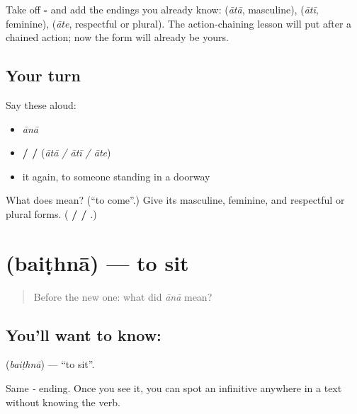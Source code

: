 \begin{grammarlens}[title={What you've built}]
Take off \textbf{-} and add the endings you already know: \textbf{} (\emph{ātā}, masculine), \textbf{} (\emph{ātī}, feminine), \textbf{} (\emph{āte}, respectful or plural). The action-chaining lesson will put \textbf{ } after a chained action; now the form will already be yours.
\end{grammarlens}

\subsection*{Your turn}
Say these aloud:

\begin{itemize}
\raggedright
  \item \emph{ānā}
  \item \textbf{ /  / } (\emph{ātā / ātī / āte})
  \item it again, to someone standing in a doorway
\end{itemize}

\begin{tcolorbox}[breakable,colback=teal!4,colframe=teal!35!black,title={Before you move on}]
What does \textbf{} mean? (\textquotedblleft{}to come\textquotedblright{}.) Give its masculine, feminine, and respectful or plural forms. (\textbf{ /  / }.)
\end{tcolorbox}
\section[\texorpdfstring{\hi{बैठना} (baiṭhnā)}{बैठना (baiṭhnā)}]{ (baiṭhnā) — to sit}

\label{lesson:HI-C42-sit}



\begin{quote}
Before the new one: what did \emph{ānā} mean?
\end{quote}

\subsection*{You'll want to know: }
\textbf{} (\emph{baiṭhnā}) — \textquotedblleft{}to sit\textquotedblright{}.

Same \emph{-} ending. Once you see it, you can spot an infinitive anywhere in a text without knowing the verb.

